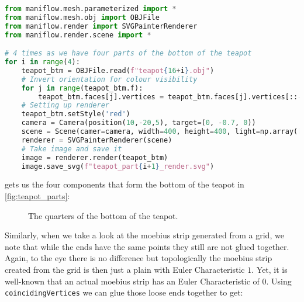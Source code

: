 \begin{lstlisting}[language=Python, caption={Visualizing the parts of the bottom of the teapot}, label={lst:teapot_btm_parts}]
from maniflow.mesh.parameterized import *
from maniflow.mesh.obj import OBJFile
from maniflow.render import SVGPainterRenderer
from maniflow.render.scene import *

# 4 times as we have four parts of the bottom of the teapot
for i in range(4):
    teapot_btm = OBJFile.read(f"teapot{16+i}.obj")
    # Invert orientation for colour visibility
    for j in range(teapot_btm.f):
        teapot_btm.faces[j].vertices = teapot_btm.faces[j].vertices[::-1]
    # Setting up renderer
    teapot_btm.setStyle('red')
    camera = Camera(position(10,-20,5), target=(0, -0.7, 0))
    scene = Scene(camer=camera, width=400, height=400, light=np.array([10, -1.5, 50]
    renderer = SVGPainterRenderer(scene)
    # Take image and save it
    image = renderer.render(teapot_btm)
    image.save_svg(f"teapot_part{i+1}_render.svg")
\end{lstlisting}

gets us the four components that form the bottom of the teapot in \autoref{fig:teapot_parts}:

\begin{figure}[H]%
\caption{The quarters of the bottom of the teapot.}
\label{fig:teapot_parts}
\end{figure}

Similarly, when we take a look at the moebius strip generated from a grid, we note that while the ends have the same points they still are not glued together. Again, to the eye there is no difference but topologically the moebius strip created from the grid is then just a plain with Euler Characteristic $1$. Yet, it is well-known that an actual moebius strip has an Euler Characteristic of $0$. Using \texttt{coincidingVertices} we can glue those loose ends together to get:

